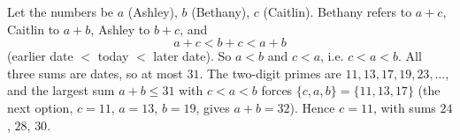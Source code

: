 Let the numbers be $a$ (Ashley), $b$ (Bethany), $c$ (Caitlin). Bethany refers to $a+c$, Caitlin to $a+b$, Ashley to $b+c$, and
\[a+c<b+c<a+b\]
(earlier date $<$ today $<$ later date). So $a<b$ and $c<a$, i.e. $c<a<b$. All three sums are dates, so at most $31$. The two-digit primes are $11,13,17,19,23,\dots$, and the largest sum $a+b\le31$ with $c<a<b$ forces $\{c,a,b\}=\{11,13,17\}$ (the next option, $c=11$, $a=13$, $b=19$, gives $a+b=32$). Hence $c=\boxed{11}$, with sums $24$, $28$, $30$.
